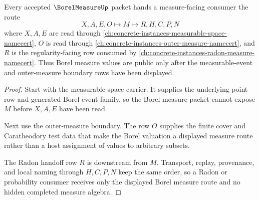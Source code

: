 \begin{theorem}
\label{thm:borel-measure-measurable-space-handoff}
Every accepted $\BorelMeasureUp$ packet hands a measure-facing consumer the route
$$
X,A,E,O \longmapsto M \longmapsto R,H,C,P,N
$$
where $X,A,E$ are read through \autoref{ch:concrete-instances-measurable-space-namecert}, $O$ is read through \autoref{ch:concrete-instances-outer-measure-namecert}, and $R$ is the regularity-facing row consumed by \autoref{ch:concrete-instances-radon-measure-namecert}. Thus Borel measure values are public only after the measurable-event and outer-measure boundary rows have been displayed.
\end{theorem}
\begin{proof}
Start with the measurable-space carrier. It supplies the underlying point row and generated Borel event family, so the Borel measure packet cannot expose $M$ before $X,A,E$ have been read.

Next use the outer-measure boundary. The row $O$ supplies the finite cover and Caratheodory test data that make the Borel valuation a displayed measure route rather than a host assignment of values to arbitrary subsets.

The Radon handoff row $R$ is downstream from $M$. Transport, replay, provenance, and local naming through $H,C,P,N$ keep the same order, so a Radon or probability consumer receives only the displayed Borel measure route and no hidden completed measure algebra.
\end{proof}




